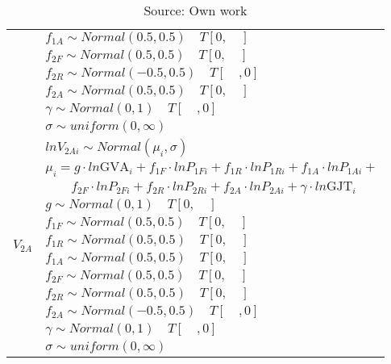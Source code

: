 \begin{table}[!ht]
\begin{tabular} {ll}
                          &$f_{1A} \sim Normal (0.5,0.5) \quad T[0,\quad]$\\
                          &$f_{2F} \sim Normal (0.5,0.5) \quad T[0,\quad]$\\
                          &$f_{2R} \sim Normal (-0.5,0.5) \quad T[\quad,0]$\\
                          &$f_{2A} \sim Normal (0.5,0.5) \quad T[0,\quad]$\\
                          &$\gamma \sim Normal (0,1)  \quad T[\quad,0]$\\
                          &$\sigma \sim uniform(0,\infty) $\\ 
\hline
\multirow{12}{*}{$V_{2A}$} &$lnV_{2Ai} \sim Normal(\mu_i, \sigma) $ \\
                          &$\mu_i = g \cdot ln \text{GVA}_i + f_{1F} \cdot lnP_{1Fi} + f_{1R} \cdot lnP_{1Ri} + f_{1A} \cdot lnP_{1Ai} +$\\
                          &$\quad \quad f_{2F} \cdot lnP_{2Fi} + f_{2R} \cdot lnP_{2Ri} + f_{2A} \cdot lnP_{2Ai} + \gamma \cdot ln\text{GJT}_i$ \\
                          &$g \sim Normal (0,1) \quad T[0,\quad]$\\
                          &$f_{1F} \sim Normal (0.5,0.5) \quad T[0,\quad]$\\
                          &$f_{1R} \sim Normal (0.5,0.5) \quad T[0,\quad]$\\
                          &$f_{1A} \sim Normal (0.5,0.5) \quad T[0,\quad]$\\
                          &$f_{2F} \sim Normal (0.5,0.5) \quad T[0,\quad]$\\
                          &$f_{2R} \sim Normal (0.5,0.5) \quad T[0,\quad]$\\
                          &$f_{2A} \sim Normal (-0.5,0.5) \quad T[\quad,0]$\\
                          &$\gamma \sim Normal (0,1)  \quad T[\quad,0]$\\
                          &$\sigma \sim uniform(0,\infty) $\\ 
\bottomrule
\end{tabular}%
\caption*{Source: Own work}
\end{table} 



